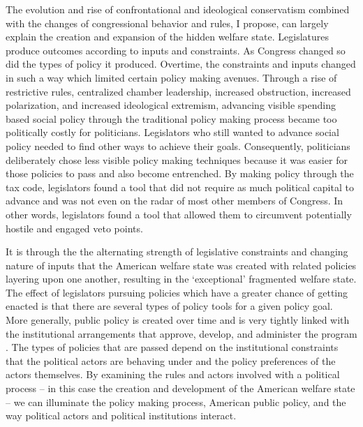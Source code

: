 \documentclass[12pt]{article}
\begin{document}
The evolution and rise of confrontational and ideological conservatism combined with the changes of congressional behavior and rules, I propose, can largely explain the creation and expansion of the hidden welfare state.  Legislatures produce outcomes according to inputs and constraints. As Congress changed so did the types of policy it produced. Overtime, the constraints and inputs changed in such a way which limited certain policy making avenues. Through a rise of restrictive rules, centralized chamber leadership, increased obstruction, increased polarization, and increased ideological extremism, advancing visible spending based social policy through the traditional policy making process became too politically costly for politicians. Legislators who still wanted to advance social policy needed to find other ways to achieve their goals. Consequently, politicians deliberately chose less visible policy making techniques because it was easier for those policies to pass and also become entrenched. By making policy through the tax code, legislators found a tool that did not require as much political capital to advance and was not even on the radar of most other members of Congress. In other words, legislators found a tool that allowed them to circumvent potentially hostile and engaged veto points. 

It is through the the alternating strength of legislative constraints and changing nature of inputs that the American welfare state was created with related policies layering upon one another, resulting in the `exceptional' fragmented welfare state. The effect of legislators pursuing policies which have a greater chance of getting enacted is that there are several types of policy tools for a given policy goal. More generally, public policy is created over time and is very tightly linked with the institutional arrangements that approve, develop, and administer the program \citep{pierson2004b}. The types of policies that are passed depend on the institutional constraints that the political actors are behaving under and the policy preferences of the actors themselves. By examining the rules and actors involved with a political process -- in this case the creation and development of the American welfare state -- we can illuminate the policy making process, American public policy, and the way political actors and political institutions interact.
\end{document}
